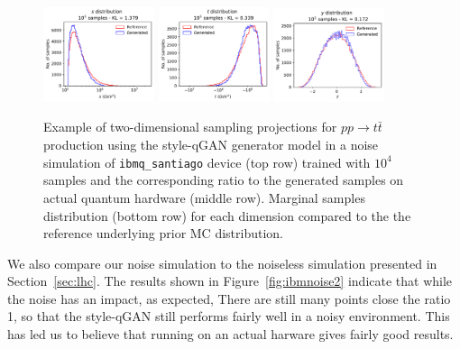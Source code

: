 \documentclass[twocolumn,preprintnumbers,superscriptaddress]{revtex4-2}
\begin{document}
\begin{figure}
  \includegraphics[width=0.29\textwidth]{plots/hardware_noise_simulation/s-distribution_LHCdata_100k_noise-simu.pdf}%
  \includegraphics[width=0.29\textwidth]{plots/hardware_noise_simulation/t-distribution_LHCdata_100k_noise-simu.pdf}%
  \includegraphics[width=0.29\textwidth]{plots/hardware_noise_simulation/y-distribution_LHCdata_100k_noise-simu.pdf}

  \caption{\label{fig:ibmnoise}Example of two-dimensional sampling projections for
  $pp \rightarrow t\bar{t}$ production using the style-qGAN generator
  model in a noise simulation of {\tt ibmq\_santiago} device (top row) trained
  with $10^4$ samples and the corresponding ratio to the generated samples on actual quantum hardware (middle row).
  Marginal samples distribution (bottom row) for each dimension compared to the the reference underlying prior MC
   distribution.}
\end{figure}

We also compare our noise simulation to the noiseless simulation presented in Section~\ref{sec:lhc}.
The results shown in Figure~\ref{fig:ibmnoise2} indicate that while the noise has an impact, as expected, There are
still many points close the ratio 1, so that the style-qGAN still performs fairly well in a noisy environment. This has led us
to believe that running on an actual harware gives fairly good results.
\end{document}
